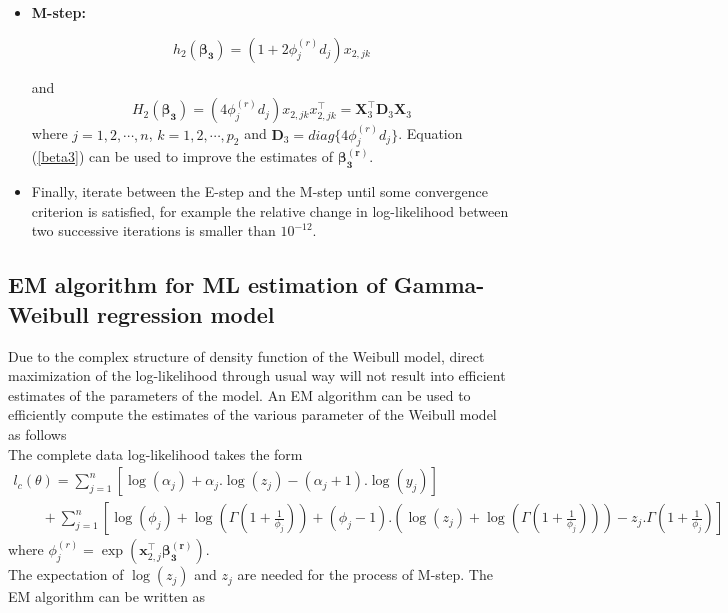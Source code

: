 \documentclass[12pt]{article}%
\theoremstyle{definition}
\theoremstyle{remark}
\begin{document}
{\begin{itemize}
	
	\item \textbf{M-step:}
	
	\begin{equation}
		h_{2}(\boldsymbol{\beta_{3}})=\left(1+2\phi^{(r)}_{j}d_{j}\right) x_{2,jk}
	\end{equation}  
	
	and
	\begin{equation}
		H_{2}(\boldsymbol{\beta_{3}})=\left(4\phi^{(r)}_{j}d_{j}\right) x_{2,jk}x_{2,jk}^{\top}=\textbf{X}_{3}^{\top}\textbf{D}_{3}\textbf{X}_{3}
	\end{equation}  
	where $j=1,2, \cdots,n$, $k=1,2, \cdots,p_{2}$ and $\textbf{D}_{3}=diag\{4\phi^{(r)}_{j}d_{j}\}$.
	Equation (\ref{beta3}) can be used to improve the estimates of $\boldsymbol{\beta_{3}^{(r)}}$.
	
	\item Finally, iterate between the E-step and the M-step until some convergence criterion is satisfied, for example the relative change in log-likelihood between two successive iterations is smaller than $10^{-12}$.
\end{itemize}
\subsection{EM algorithm for ML estimation of Gamma-Weibull regression model}
Due to the complex structure of density function of the Weibull model, direct maximization of the log-likelihood through usual way will not result into efficient estimates of the parameters of the model. An EM algorithm can be used to efficiently compute the estimates of the various parameter of the Weibull model as follows\\
The complete data log-likelihood takes the form
\begin{multline}
	l_{c}(\theta)=\sum_{j=1}^{n}\left[\log(\alpha_{j})+\alpha_{j}.\log(z_{j})-(\alpha_{j}+1).\log(y_{j})\right]\\
	\quad \quad + \sum_{j=1}^{n} \left[\log(\phi_{j})+\log\left(\Gamma\left(1+\frac{1}{\phi_{j}}\right)\right)+(\phi_{j}-1).\left(\log(z_{j})+\log\left(\Gamma\left(1+\frac{1}{\phi_{j}}\right)\right)\right)-z_{j}.\Gamma\left(1+\frac{1}{\phi_{j}}\right)\right]
\end{multline}
where $\phi^{(r)}_{j}=\exp(\mathbf{x}_{2,j}^{\top}\boldsymbol{\beta_{3}^{(r)}})$.\\
The expectation of $\log(z_{j})$ and $z_{j}$ are needed for the process of M-step. The EM algorithm can be written as

}
\end{document}
